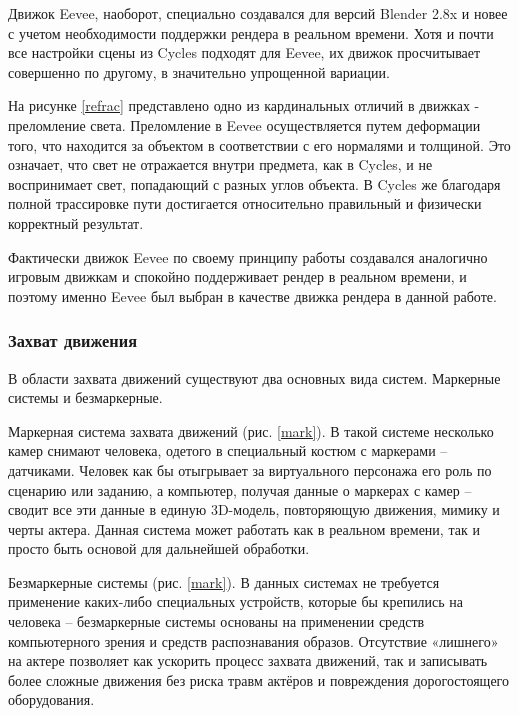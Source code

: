Движок Eevee, наоборот, специально создавался для версий Blender 2.8x и новее с учетом необходимости поддержки рендера в реальном времени. Хотя и почти все настройки сцены из Cycles подходят для Eevee, их движок просчитывает совершенно по другому, в значительно упрощенной вариации. 

На рисунке \ref{refrac} представлено одно из кардинальных отличий в движках - преломление света. Преломление в Eevee осуществляется путем деформации того, что находится за объектом в соответствии с его нормалями и толщиной. Это означает, что свет не отражается внутри предмета, как в Cycles, и не воспринимает свет, попадающий с разных углов объекта. В Cycles же благодаря полной трассировке пути достигается относительно правильный и физически корректный результат.
 


Фактически движок Eevee по своему принципу работы создавался аналогично игровым движкам и спокойно поддерживает рендер в реальном времени, и поэтому именно Eevee был выбран в качестве движка рендера в данной работе.

\subsubsection{Захват движения}

В области захвата движений существуют два основных вида систем. Маркерные системы и безмаркерные.

Маркерная система захвата движений (рис. \ref{mark}). В такой системе несколько камер снимают человека, одетого в специальный костюм с маркерами – датчиками. Человек как бы отыгрывает за виртуального персонажа его роль по сценарию или заданию, а компьютер, получая данные о маркерах с камер – сводит все эти данные в единую 3D-модель, повторяющую движения, мимику и черты актера. Данная система может работать как в реальном времени, так и просто быть основой для дальнейшей обработки.


Безмаркерные системы (рис. \ref{mark}). В данных системах не требуется применение каких-либо специальных устройств, которые бы крепились на человека – безмаркерные системы основаны на применении средств компьютерного зрения и средств распознавания образов. Отсутствие «лишнего» на актере позволяет как ускорить процесс захвата движений, так и записывать более сложные движения без риска травм актёров и повреждения дорогостоящего оборудования.

